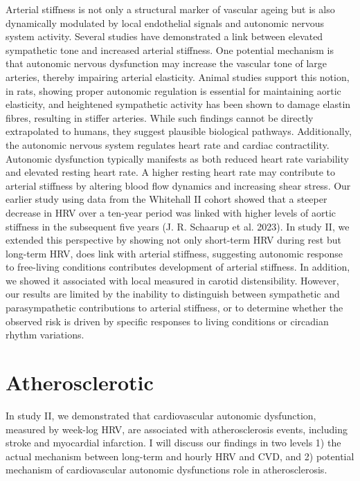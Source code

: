 \documentclass[
  a4paper,
  headsepline=true,
  open=any]{scrbook}
\begin{document}
Arterial stiffness is not only a structural marker of vascular ageing
but is also dynamically modulated by local endothelial signals and
autonomic nervous system activity. Several studies have demonstrated a
link between elevated sympathetic tone and increased arterial stiffness.
One potential mechanism is that autonomic nervous dysfunction may
increase the vascular tone of large arteries, thereby impairing arterial
elasticity. Animal studies support this notion, in rats, showing proper
autonomic regulation is essential for maintaining aortic elasticity, and
heightened sympathetic activity has been shown to damage elastin fibres,
resulting in stiffer arteries. While such findings cannot be directly
extrapolated to humans, they suggest plausible biological pathways.
Additionally, the autonomic nervous system regulates heart rate and
cardiac contractility. Autonomic dysfunction typically manifests as both
reduced heart rate variability and elevated resting heart rate. A higher
resting heart rate may contribute to arterial stiffness by altering
blood flow dynamics and increasing shear stress. Our earlier study using
data from the Whitehall II cohort showed that a steeper decrease in HRV
over a ten-year period was linked with higher levels of aortic stiffness
in the subsequent five years (J. R. Schaarup et al. 2023). In study II,
we extended this perspective by showing not only short-term HRV during
rest but long-term HRV, does link with arterial stiffness, suggesting
autonomic response to free-living conditions contributes development of
arterial stiffness. In addition, we showed it associated with local
measured in carotid distensibility. However, our results are limited by
the inability to distinguish between sympathetic and parasympathetic
contributions to arterial stiffness, or to determine whether the
observed risk is driven by specific responses to living conditions or
circadian rhythm variations.

\hypertarget{atherosclerotic}{%
\section{Atherosclerotic}\label{atherosclerotic}}

In study II, we demonstrated that cardiovascular autonomic dysfunction,
measured by week-log HRV, are associated with atherosclerosis events,
including stroke and myocardial infarction. I will discuss our findings
in two levels 1) the actual mechanism between long-term and hourly HRV
and CVD, and 2) potential mechanism of cardiovascular autonomic
dysfunctions role in atherosclerosis.
\end{document}
